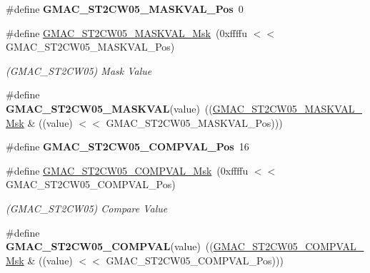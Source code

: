 \begin{DoxyCompactItemize}
\#define {\bfseries G\+M\+A\+C\+\_\+\+S\+T2\+C\+W05\+\_\+\+M\+A\+S\+K\+V\+A\+L\+\_\+\+Pos}~0
\item 
\mbox{\label{group__SAME70__GMAC_gac6e128d845b3bc8cc07d943e547e54a1}} 
\#define \mbox{\hyperlink{group__SAME70__GMAC_gac6e128d845b3bc8cc07d943e547e54a1}{G\+M\+A\+C\+\_\+\+S\+T2\+C\+W05\+\_\+\+M\+A\+S\+K\+V\+A\+L\+\_\+\+Msk}}~(0xffffu $<$$<$ G\+M\+A\+C\+\_\+\+S\+T2\+C\+W05\+\_\+\+M\+A\+S\+K\+V\+A\+L\+\_\+\+Pos)
\begin{DoxyCompactList}\small\item\em (G\+M\+A\+C\+\_\+\+S\+T2\+C\+W05) Mask Value \end{DoxyCompactList}\item 
\mbox{\label{group__SAME70__GMAC_gac89cd79ee5dee9ff479a37f86959238d}} 
\#define {\bfseries G\+M\+A\+C\+\_\+\+S\+T2\+C\+W05\+\_\+\+M\+A\+S\+K\+V\+AL}(value)~((\mbox{\hyperlink{group__SAMV71__GMAC_gac6e128d845b3bc8cc07d943e547e54a1}{G\+M\+A\+C\+\_\+\+S\+T2\+C\+W05\+\_\+\+M\+A\+S\+K\+V\+A\+L\+\_\+\+Msk}} \& ((value) $<$$<$ G\+M\+A\+C\+\_\+\+S\+T2\+C\+W05\+\_\+\+M\+A\+S\+K\+V\+A\+L\+\_\+\+Pos)))
\item 
\mbox{\label{group__SAME70__GMAC_ga0b7e752dd32614a83eccc9699bd41633}} 
\#define {\bfseries G\+M\+A\+C\+\_\+\+S\+T2\+C\+W05\+\_\+\+C\+O\+M\+P\+V\+A\+L\+\_\+\+Pos}~16
\item 
\mbox{\label{group__SAME70__GMAC_ga4fed340f7f3215dafbc1a6188948e71c}} 
\#define \mbox{\hyperlink{group__SAME70__GMAC_ga4fed340f7f3215dafbc1a6188948e71c}{G\+M\+A\+C\+\_\+\+S\+T2\+C\+W05\+\_\+\+C\+O\+M\+P\+V\+A\+L\+\_\+\+Msk}}~(0xffffu $<$$<$ G\+M\+A\+C\+\_\+\+S\+T2\+C\+W05\+\_\+\+C\+O\+M\+P\+V\+A\+L\+\_\+\+Pos)
\begin{DoxyCompactList}\small\item\em (G\+M\+A\+C\+\_\+\+S\+T2\+C\+W05) Compare Value \end{DoxyCompactList}\item 
\mbox{\label{group__SAME70__GMAC_gaab96c596f4f85294c54bfc11399b0e17}} 
\#define {\bfseries G\+M\+A\+C\+\_\+\+S\+T2\+C\+W05\+\_\+\+C\+O\+M\+P\+V\+AL}(value)~((\mbox{\hyperlink{group__SAMV71__GMAC_ga4fed340f7f3215dafbc1a6188948e71c}{G\+M\+A\+C\+\_\+\+S\+T2\+C\+W05\+\_\+\+C\+O\+M\+P\+V\+A\+L\+\_\+\+Msk}} \& ((value) $<$$<$ G\+M\+A\+C\+\_\+\+S\+T2\+C\+W05\+\_\+\+C\+O\+M\+P\+V\+A\+L\+\_\+\+Pos)))

\end{DoxyCompactItemize}
